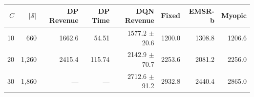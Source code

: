 \begin{tabular}{r r r r r r r r}
\toprule
$C$ & $|\mathcal{S}|$ & DP Revenue & DP Time & DQN Revenue & Fixed & EMSR-b & Myopic \\
\midrule
10 & 660 & 1662.6 & 54.51 & 1577.2 $\pm$ 20.6 & 1200.0 & 1308.8 & 1206.6 \\
20 & 1,260 & 2415.4 & 115.74 & 2142.9 $\pm$ 70.7 & 2253.6 & 2081.2 & 2256.0 \\
30 & 1,860 & --- & --- & 2712.6 $\pm$ 91.2 & 2932.8 & 2440.4 & 2865.0 \\
\bottomrule
\end{tabular}